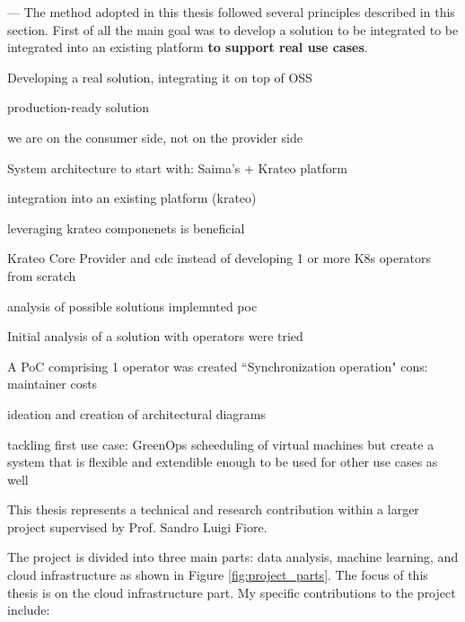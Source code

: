 ---
The method adopted in this thesis followed several principles described in this section.
First of all the main goal was to develop a solution to be integrated to be integrated into an existing platform \textbf{to support real use cases}.

Developing a real solution, integrating it on top of OSS

production-ready solution

we are on the consumer side, not on the provider side

System architecture to start with: Saima's + Krateo platform

integration into an existing platform (krateo)

leveraging krateo componenets is beneficial 

Krateo Core Provider and cdc instead of developing 1 or more K8s operators from scratch


analysis of possible solutions
implemnted poc 

Initial analysis of a solution with operators were tried

A PoC comprising 1 operator was created 
``Synchronization operation"
cons: maintainer costs

ideation and creation of architectural diagrams

tackling first use case: GreenOps scheeduling of virtual machines
but create a system that is flexible and extendible enough to be used for other use cases as well


This thesis represents a technical and research contribution within a larger project supervised by Prof. Sandro Luigi Fiore. 

The project is divided into three main parts: data analysis, machine learning, and cloud infrastructure as shown in Figure \ref{fig:project_parts}.
The focus of this thesis is on the cloud infrastructure part.
My specific contributions to the project include:





\newpage

